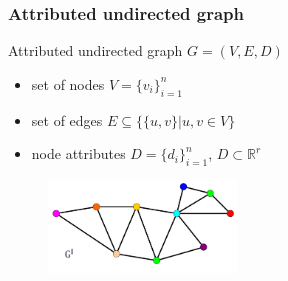 \documentclass[hyperref={pdfpagelabels=false}]{beamer}
\begin{document}
\begin{frame}
\frametitle{Attributed undirected graph}
Attributed undirected graph $G=(V,E,D)$
\begin{itemize}
\item set of nodes $V=\{v_i\}_{i=1}^{n}$
\item set of edges $E\subseteq\{\{u,v\}| u, v\in V\}$
\item node attributes $D=\{d_i\}_{i=1}^{n}$, $D\subset\mathbb{R}^r$
\end{itemize}
\vspace{1cm}
\begin{figure}[b]
    \centering
    \includegraphics[width=5cm]{fig/at_graph_1.pdf}
\end{figure}%
\end{frame}
\end{document}
